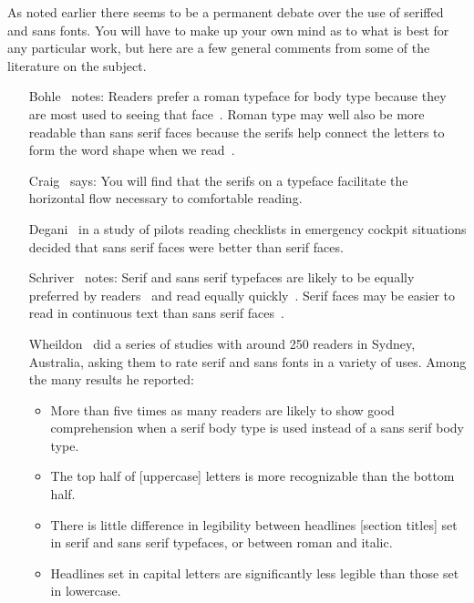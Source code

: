 \documentclass[10pt,a4paper,oneside,extrafontsizes]{memoir}%
\begin{document}
\begin{paracol}{2}
\switchEng
    As noted earlier there seems to be a permanent debate over the use
of seriffed and sans fonts. You will have to make up your own mind as
to what is best for any particular work, but here are a few general
comments from some of the literature on the subject.

\begin{itemize}
\def\makelabel#1{\noindent #1}
\item[Bohle~\autocite{BOHLE90}] notes: Readers prefer a roman typeface for body
  type because they are most used to seeing that face~\autocite{REHE72}.
  Roman type may well also be more readable than sans serif faces because
  the serifs help connect the letters to form the word shape when
  we read~\autocite{REHE72}.

\item[Craig~\autocite{CRAIG92}] says: You will find that the serifs on a typeface
  facilitate the horizontal flow necessary to comfortable reading.

\item[Degani~\autocite{DEGANI92}] in a study of pilots reading checklists
  in emergency cockpit situations decided that sans serif faces were
  better than serif faces.

\item[Schriver~\autocite{SCHRIVER97}] notes: Serif and sans serif typefaces 
  are likely to be equally preferred by 
  readers~\autocite{HARTLEY83,TINKER63}
  and read equally quickly~\autocite{GOULD87,HARTLEY83,ZACHRISSOM69}.
  Serif faces may be easier to read in continuous text than sans
  serif faces~\autocite{BURT59,HVISTENDAHL75,ROBINSON71,WHEILDON95}.

\item[Wheildon~\autocite{WHEILDON95}] did a series of studies with around
250 readers in Sydney, Australia, asking them to rate serif and sans fonts
in a variety of uses. Among the many results he reported:
\begin{itemize}
  \item More than five times as many readers are likely to show good
  comprehension when a serif body type is used instead of a sans serif
  body type.
  \item The top half of [uppercase] letters is more recognizable than
  the bottom half.
  \item There is little difference in legibility between headlines
  [section titles] set in serif and sans serif typefaces, or between
  roman and italic.
  \item Headlines set in capital letters are significantly less legible
  than those set in lowercase.
\end{itemize}


\end{itemize}
\end{paracol}
\end{document}
